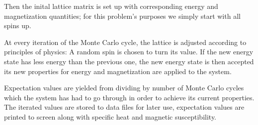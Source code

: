 \documentclass[11pt,a4paper,notitlepage,twocolumn]{article}
\begin{document}
Then the inital lattice matrix is set up with corresponding energy and magnetization quantities; for this problem's purposes we simply start with all spins up.

At every iteration of the Monte Carlo cycle, the lattice is adjusted according to principles of physics: A random spin is chosen to turn its value. If the new energy state has less energy than the previous one, the new energy state is then accepted its new properties for energy and magnetization are applied to the system.

Expectation values are yielded from dividing by number of Monte Carlo cycles which the system has had to go through in order to achieve its current properties. The iterated values are stored to data files for later use, expectation values are printed to screen along with specific heat and magnetic susceptibility.
\end{document}
